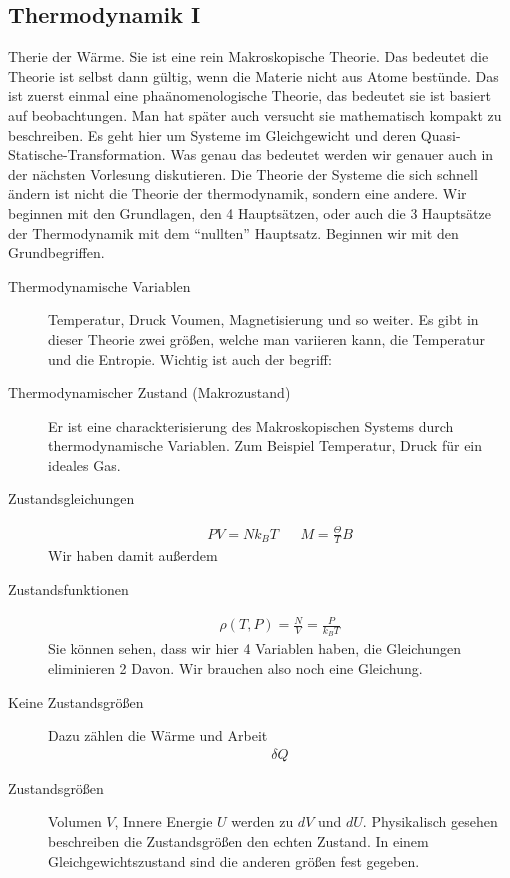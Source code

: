 \documentclass[11pt]{article}
\theoremstyle{plain}
\theoremstyle{mytheoremstyle}
\begin{document}
\subsection*{Thermodynamik I}
Therie der W\"arme. Sie ist eine rein Makroskopische Theorie. Das bedeutet die
Theorie ist selbst dann g\"ultig, wenn die Materie nicht aus Atome best\"unde.
Das ist zuerst einmal eine pha\"anomenologische Theorie, das bedeutet sie ist
basiert auf beobachtungen. Man hat sp\"ater auch versucht sie mathematisch
kompakt zu beschreiben. Es geht hier um Systeme im Gleichgewicht und deren
Quasi-Statische-Transformation. Was genau das bedeutet werden wir genauer auch
in der n\"achsten Vorlesung diskutieren. Die Theorie der Systeme die sich
schnell \"andern ist nicht die Theorie der thermodynamik, sondern eine andere.
Wir beginnen mit den Grundlagen, den 4 Haupts\"atzen, oder auch die 3
Haupts\"atze der Thermodynamik mit dem ``nullten'' Hauptsatz.  Beginnen wir mit
den Grundbegriffen.  
\begin{description} \item[Thermodynamische Variablen] Temperatur, Druck Voumen,
      Magnetisierung und so weiter. Es gibt in dieser Theorie zwei gr\"o\ss{}en,
      welche man variieren kann, die Temperatur und die Entropie. Wichtig
      ist auch der begriff:
    \item[Thermodynamischer Zustand (Makrozustand)]
      Er ist eine charackterisierung des Makroskopischen Systems durch 
      thermodynamische Variablen. Zum Beispiel
      Temperatur, Druck f\"ur ein ideales Gas.
    \item[Zustandsgleichungen] 
      \begin{align*}
        PV = N k_B T &&
        M = \frac{\Theta}{T} B
      \end{align*}
      Wir haben damit au\ss{}erdem
    \item[Zustandsfunktionen] 
      \begin{align*}
        \rho(T, P) = \frac{N}{V} = \frac{P}{k_B T}
      \end{align*}
      Sie k\"onnen sehen, dass wir hier 4 Variablen haben, die Gleichungen
      eliminieren 2 Davon. Wir brauchen also noch eine Gleichung.
      
    \item[Keine Zustandsgr\"o\ss{}en] Dazu z\"ahlen 
      die W\"arme und Arbeit
      \begin{align*}
        \delta{Q}
      \end{align*}
    \item[Zustandsgr\"o\ss{}en] Volumen $V$, Innere Energie $U$
      werden zu $dV$ und $dU$.
      Physikalisch gesehen beschreiben die Zustandsgr\"o\ss{}en den 
      echten Zustand. In einem Gleichgewichtszustand sind die anderen gr\"o\ss{}en
      fest gegeben.
\end{description} 
\end{document}
